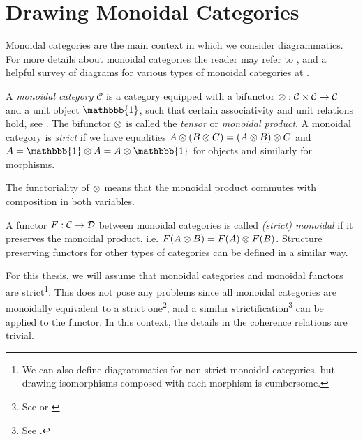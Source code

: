 \section{Drawing Monoidal Categories}
\label{sec:monoidal-cat}

Monoidal categories are the main context in which we consider diagrammatics. For more details about monoidal categories the reader may refer to \cite{tensor-categories}, and a helpful survey of diagrams for various types of monoidal categories at \cite{selinger-survey-of-graphical-monoidal-categories}.

\begin{definition}
    A \textit{monoidal category} $\mathcal{C}$ is a category equipped with a bifunctor $\otimes: \mathcal{C} \times \mathcal{C} \to \mathcal{C}$ and a unit object $\mathbbb{1}$, such that certain associativity and unit relations hold, see \cite[Definition 2.1.1, 2.2.8]{tensor-categories}. The bifunctor $\otimes$ is called the \textit{tensor} or \textit{monoidal product}. A monoidal category is \textit{strict} if we have equalities $A \otimes (B \otimes C) = (A \otimes B) \otimes C$ and $A = \mathbbb{1} \tensor A = A \tensor \mathbbb{1}$ for objects and similarly for morphisms.
\end{definition}

The functoriality of $\otimes$ means that the monoidal product commutes with composition in both variables.

\begin{definition}
    A functor $F: \mathcal{C} \to \mathcal{D}$ between monoidal categories is called \textit{(strict) monoidal} if it preserves the monoidal product, i.e. $F(A \otimes B) = F(A) \otimes F(B)$. Structure preserving functors for other types of categories can be defined in a similar way.
\end{definition}

For this thesis, we will assume that monoidal categories and monoidal functors are strict\footnote{We can also define diagrammatics for non-strict monoidal categories, but drawing isomorphisms composed with each morphism is cumbersome.}. This does not pose any problems since all monoidal categories are monoidally equivalent to a strict one\footnote{See \cite[\nopp VII.2]{maclane-category-theory} or \cite[Theorem 2.8.5]{tensor-categories}}, and a similar strictification\footnote{See \cite{power-general-coherence}.} can be applied to the functor. In this context, the details in the coherence relations are trivial.

